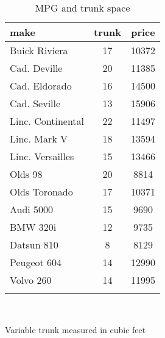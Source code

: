 \documentclass{article}
\begin{document}
\begin{table}[tbp] \centering
{}

\caption{MPG and trunk space}
\begin{tabularx}{\linewidth}{Lcc}

\toprule
{make}&{trunk}&{price} \tabularnewline
\midrule \addlinespace[\belowrulesep]
Buick Riviera&17&10372 \tabularnewline
Cad. Deville&20&11385 \tabularnewline
Cad. Eldorado&16&14500 \tabularnewline
Cad. Seville&13&15906 \tabularnewline
Linc. Continental&22&11497 \tabularnewline
Linc. Mark V&18&13594 \tabularnewline
Linc. Versailles&15&13466 \tabularnewline
Olds 98&20&8814 \tabularnewline
Olds Toronado&17&10371 \tabularnewline
Audi 5000&15&9690 \tabularnewline
BMW 320i&12&9735 \tabularnewline
Datsun 810&8&8129 \tabularnewline
Peugeot 604&14&12990 \tabularnewline
Volvo 260&14&11995 \tabularnewline
\bottomrule \addlinespace[\belowrulesep]

\end{tabularx}
\\ \parbox{\linewidth}{\footnotesize Variable trunk measured in cubic feet}
\end{table}
\end{document}
